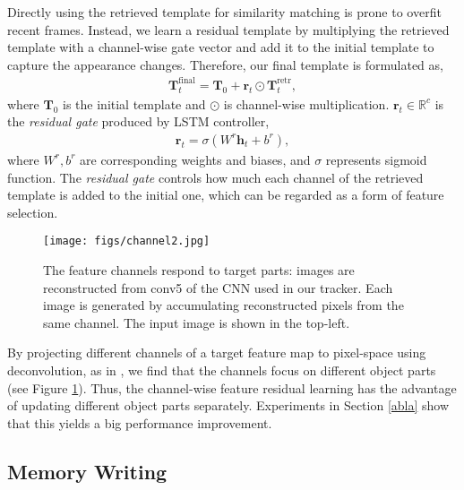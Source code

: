 \documentclass[runningheads]{llncs}
\begin{document}
Directly using the retrieved template for similarity matching  is prone to overfit recent frames.
Instead, we learn a residual template by multiplying the retrieved template with a channel-wise gate vector and add it to the initial template to capture the appearance changes. Therefore, our final template is formulated as,
\begin{align}
\mathbf{T}^{\text{final}}_t = \mathbf{T}_0+ \mathbf{r}_t\odot \mathbf{T}^{\text{retr}}_t,
\end{align}
where $\mathbf{T}_0$ is the initial template and  $\odot$ is channel-wise multiplication.
$\mathbf{r}_t\in \mathbb{R}^c$ is the \textit{residual gate} produced by LSTM controller, 
\begin{align}
\mathbf{r}_t = \sigma (W^r\mathbf{h}_{t}+b^r),
\end{align}
where $W^r, b^r$ are corresponding weights and biases, and $\sigma$ represents sigmoid function. 
The \textit{residual gate} controls how much each channel of the retrieved template is added to the initial one, which can be regarded as a form of feature selection. 

\begin{figure}[t]
	\begin{center}
		\texttt{[image: figs/channel2.jpg]}
	\end{center}
	\caption{The feature channels respond to target parts: images are reconstructed from conv5 of the CNN used in our tracker. Each image is generated by accumulating reconstructed pixels from the same channel. The input image is shown in the top-left. }
	\label{fig:6}
\end{figure}

By projecting different channels of a target feature map to pixel-space using deconvolution, as in \cite{Zeiler2014}, we find that the channels focus on different object parts (see Figure \ref{fig:6}). %
Thus, the channel-wise feature residual learning has the advantage of updating different object parts separately. Experiments in Section \ref{abla} show that this yields a big performance improvement. 


\subsection{Memory Writing}
\end{document}
